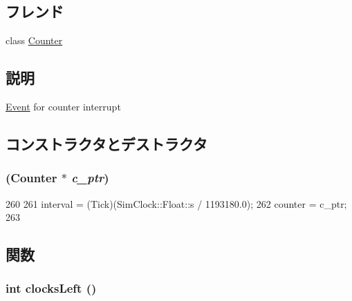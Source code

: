 \subsection*{フレンド}
\begin{DoxyCompactItemize}
\item 
class \hyperlink{classIntel8254Timer_1_1Counter_1_1CounterEvent_ab25f3b4c3811997d7268d73eb481f239}{Counter}
\end{DoxyCompactItemize}


\subsection{説明}
\hyperlink{classEvent}{Event} for counter interrupt 

\subsection{コンストラクタとデストラクタ}
\hypertarget{classIntel8254Timer_1_1Counter_1_1CounterEvent_ab6d9218485f102565f36e311280c4492}{
\subsubsection[{CounterEvent}]{ ({\bf Counter} $\ast$ {\em c\_\-ptr})}}
\label{classIntel8254Timer_1_1Counter_1_1CounterEvent_ab6d9218485f102565f36e311280c4492}



\begin{DoxyCode}
260 {
261     interval = (Tick)(SimClock::Float::s / 1193180.0);
262     counter = c_ptr;
263 }
\end{DoxyCode}


\subsection{関数}
\hypertarget{classIntel8254Timer_1_1Counter_1_1CounterEvent_aa10572135976d91fe76781b80fd2f77a}{
\subsubsection[{clocksLeft}]{\setlength{\rightskip}{0pt plus 5cm}int clocksLeft ()}}
\label{classIntel8254Timer_1_1Counter_1_1CounterEvent_aa10572135976d91fe76781b80fd2f77a}



